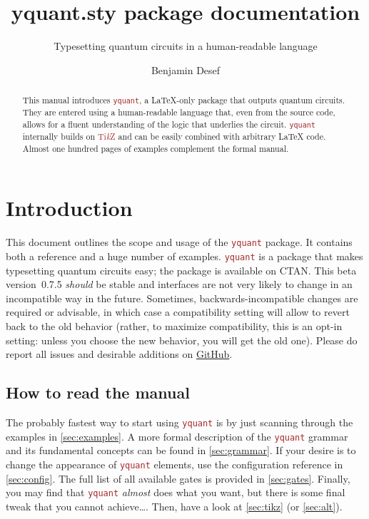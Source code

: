 \documentclass{scrartcl}
\title{yquant.sty package documentation}
\subtitle{Typesetting quantum circuits in a human-readable language}
\author{Benjamin Desef}
\makeatletter
\def\TikZ{\textcolor{brown}{Ti\textit kZ}}
\def\pkg#1{\textcolor{brown}{\texttt{#1}}}
\def\Yquant{\pkg{yquant}}
\newcommand*{\the@orig@section}{}
\let\the@orig@section=\section
\renewcommand*{\section}{%
   \clearpage%
   \the@orig@section%
}
\makeatother
\begin{document}
   \maketitle
   \begin{abstract}
      \noindent This manual introduces \Yquant, a \LaTeX\hyp only package that outputs quantum circuits.
      They are entered using a human\hyp readable language that, even from the source code, allows for a fluent understanding of the logic that underlies the circuit.
      \Yquant{} internally builds on \TikZ{} and can be easily combined with arbitrary \LaTeX{} code.
      Almost one hundred pages of examples complement the formal manual.
   \end{abstract}
   \tableofcontents

   \section{Introduction}
      This document outlines the scope and usage of the \Yquant{} package.
      It contains both a reference and a huge number of examples.
      \Yquant{} is a package that makes typesetting quantum circuits easy; the package is available on CTAN.
      This beta version~0.7.5 \emph{should} be stable and interfaces are not very likely to change in an incompatible way in the future.
      Sometimes, backwards\hyp incompatible changes are required or advisable, in which case a compatibility setting will allow to revert back to the old behavior (rather, to maximize compatibility, this is an opt\hyp in setting: unless you choose the new behavior, you will get the old one).
      Please do report all issues and desirable additions on \href{https://github.com/projekter/yquant/issues}{GitHub}.

      \subsection{How to read the manual}
         The probably fastest way to start using \Yquant{} is by just scanning through the examples in \cref{sec:examples}.
         A more formal description of the \Yquant{} grammar and its fundamental concepts can be found in \cref{sec:grammar}.
         If your desire is to change the appearance of \Yquant{} elements, use the configuration reference in \cref{sec:config}.
         The full list of all available gates is provided in \cref{sec:gates}.
         Finally, you may find that \Yquant{} \emph{almost} does what you want, but there is some final tweak that you cannot achieve\dots.
         Then, have a look at \cref{sec:tikz} (or \cref{sec:alt}).
\end{document}
